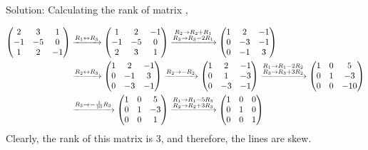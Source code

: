 \documentclass{beamer}
\begin{document}
\begin{frame}{Solution: }
\noindent
Calculating the rank of  matrix ,

\begin{align*}
    \begin{pmatrix}2 & 3 & 1 \\ -1 & -5 & 0 \\ 1 & 2 & -1\end{pmatrix} 
    &\xrightarrow{R_1 \leftrightarrow R_3} \begin{pmatrix}1 & 2 & -1 \\ -1 & -5 & 0 \\ 2 & 3 & 1\end{pmatrix} 
    \xrightarrow{\substack{R_2 \to R_2 + R_1 \\ R_3 \to R_3 - 2R_1}} \begin{pmatrix}1 & 2 & -1 \\ 0 & -3 & -1 \\ 0 & -1 & 3\end{pmatrix} \\
    &\xrightarrow{R_2 \leftrightarrow R_3} \begin{pmatrix}1 & 2 & -1 \\ 0 & -1 & 3 \\ 0 & -3 & -1\end{pmatrix}
    \xrightarrow{R_2 \to -R_2} \begin{pmatrix}1 & 2 & -1 \\ 0 & 1 & -3 \\ 0 & -3 & -1\end{pmatrix} 
    \xrightarrow{\substack{R_1 \to R_1 - 2R_2 \\ R_3 \to R_3 + 3R_2}} \begin{pmatrix}1 & 0 & 5 \\ 0 & 1 & -3 \\ 0 & 0 & -10\end{pmatrix} \\
    &\xrightarrow{R_3 \to -\frac{1}{10}R_3} \begin{pmatrix}1 & 0 & 5 \\ 0 & 1 & -3 \\ 0 & 0 & 1\end{pmatrix} 
    \xrightarrow{\substack{R_1 \to R_1 - 5R_3 \\ R_2 \to R_2 + 3R_3}} \begin{pmatrix}1 & 0 & 0 \\ 0 & 1 & 0 \\ 0 & 0 & 1\end{pmatrix}
\end{align*} 
Clearly, the rank of this matrix is 3, and therefore, the lines are skew.
\end{frame}
\end{document}

